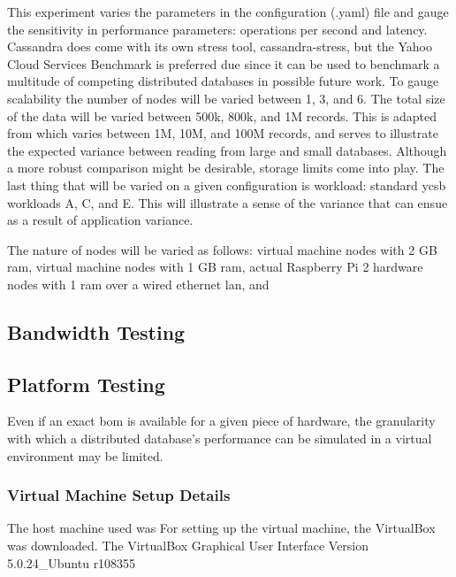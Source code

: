 This experiment varies the parameters in the configuration (.yaml) file and gauge the sensitivity in performance parameters: operations per second and latency.
Cassandra does come with its own stress tool, cassandra-stress, but the Yahoo Cloud Services Benchmark \cite{YahooBenchmark} is preferred due since it can be used to benchmark a multitude of competing distributed databases in possible future work.
To gauge scalability the number of nodes will be varied between 1, 3, and 6.
The total size of the data will be varied between 500k, 800k, and 1M records.  This is adapted from \cite{Abramova2014TestingCassandra} which varies between 1M, 10M, and 100M records, and serves to illustrate the expected variance between reading from large and small databases.  Although a more robust comparison might be desirable, storage limits come into play.
The last thing that will be varied on a given configuration is workload: standard \gls{ycsb} workloads A, C, and E.  This will illustrate a sense of the variance that can ensue as a result of application variance.

The nature of nodes will be varied as follows: virtual machine nodes with 2 GB \gls{ram}, virtual machine nodes with 1 GB \gls{ram}, actual Raspberry Pi 2 hardware nodes with 1 \gls{ram} \cite{RaspberryPi} over a wired ethernet \gls{lan}, and 

\subsection{Bandwidth Testing}

\subsection{Platform Testing}

Even if an exact \gls{bom} is available for a given piece of hardware, the granularity with which a distributed database's performance can be simulated in a virtual environment may be limited.

\subsubsection{Virtual Machine Setup Details}

The host machine used was 
For setting up the virtual machine, the 
VirtualBox was downloaded.  The 
VirtualBox Graphical User Interface Version 5.0.24\_Ubuntu r108355

